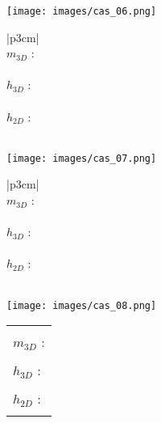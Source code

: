 \documentclass[10pt,fleqn]{article} %
\begin{document}
\begin{multicols}{2}
\begin{minipage}[c]{.45\linewidth}
\begin{center}
\texttt{[image: images/cas\_06.png]}
\end{center}
\end{minipage} \hfill
\begin{minipage}[c]{.5\linewidth}
\begin{center}
\begin{tabular}{|p{3cm}|}
\hline 
\\
$m_{3D}$ : \\
\\
$h_{3D}$ : \\
\\
$h_{2D}$ : \\
\\
\hline
\end{tabular}
\end{center}
\end{minipage}


\begin{minipage}[c]{.45\linewidth}
\begin{center}
\texttt{[image: images/cas\_07.png]}
\end{center}
\end{minipage} \hfill
\begin{minipage}[c]{.5\linewidth}
\begin{center}
\begin{tabular}{|p{3cm}|}
\hline 
\\
$m_{3D}$ : \\
\\
$h_{3D}$ : \\
\\
$h_{2D}$ : \\
\\
\hline
\end{tabular}
\end{center}
\end{minipage}


\begin{minipage}[c]{.45\linewidth}
\begin{center}
\texttt{[image: images/cas\_08.png]}
\end{center}
\end{minipage} \hfill
\begin{minipage}[c]{.5\linewidth}
\begin{center}
\begin{tabular}{|p{3cm}|}
\hline 
\\
$m_{3D}$ : \\
\\
$h_{3D}$ : \\
\\
$h_{2D}$ : \\
\\
\hline
\end{tabular}
\end{center}
\end{minipage}



\end{multicols}
\end{document}
